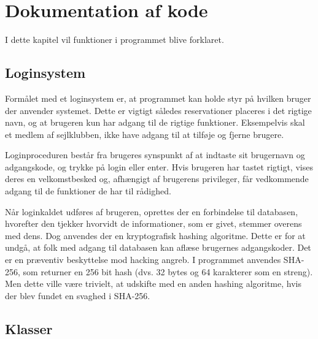\chapter{Dokumentation af kode} \label{chap:kode_docs}
I dette kapitel vil funktioner i programmet blive forklaret.

\section{Loginsystem} \label{sec:login}
Formålet med et loginsystem er, at programmet kan holde styr på hvilken bruger der anvender systemet. 
Dette er vigtigt således reservationer placeres i det rigtige navn, og at brugeren kun har adgang til de rigtige funktioner. 
Eksempelvis skal et medlem af sejlklubben, ikke have adgang til at tilføje og fjerne brugere. 

Loginproceduren består fra brugeres synspunkt af at indtaste sit brugernavn og adgangskode, og trykke på login eller enter. 
Hvis brugeren har tastet rigtigt, vises deres en velkomstbesked og, afhængigt af brugerens privileger, får vedkommende adgang til de funktioner de har til rådighed.

Når loginkaldet udføres af brugeren, oprettes der en forbindelse til databasen, hvorefter den tjekker hvorvidt de informationer, som er givet, stemmer overens med dens. 
Dog anvendes der en kryptografisk hashing algoritme. Dette er for at undgå, at folk med adgang til databasen kan aflæse brugernes adgangskoder.
Det er en præventiv beskyttelse mod hacking angreb.
I programmet anvendes SHA-256, som returner en 256 bit hash (dvs. 32 bytes og 64 karakterer som en streng). 
Men dette ville være trivielt, at udskifte med en anden hashing algoritme, hvis der blev fundet en svaghed i SHA-256. 


\section{Klasser}
